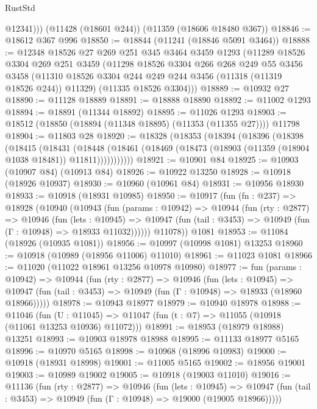 \begin{lexlean}{RustStd}
\begin{coremodule}
{{{{{{{{{{{{{{{{{{{          @12341)))
    (@11428 (@18601 @244))
    (@11359 (@18606 @18480 @367))
@18846 := @18612 @367 @996
@18850 := @18844 (@11241 (@18846 @5091 @3464))
@18888 := @12348
    @18526
    @27
    @269
    @251
    @345
    @3464
    @3459
    @1293
    (@11289
      @18526
      @3304
      @269
      @251
      @3459
      (@11298
        @18526
        @3304
        @266
        @268
        @249
        @55
        @3456
        @3458
        (@11310 @18526 @3304 @244 @249 @244 @3456 (@11318 (@11319 @18526 @244)) @11329)
        (@11335 @18526 @3304)))
@18889 := @10932 @27
@18890 := @11128 @18889
@18891 := @18888 @18890
@18892 := @11002 @1293
@18894 := @18891 (@11344 @18892)
@18895 := @11026 @1293
@18903 := @18512 (@18850 (@18894 (@11348 @18895) (@11353 (@11355 @27)))) @11798
@18904 := @11803 @28
@18920 := @18328
    (@18353
      (@18394
        (@18396
          (@18398
            (@18415
              (@18431
                (@18448
                  (@18461 (@18469 (@18473 (@18903 (@11359 (@18904 @1038 @18481)) @11811)))))))))))
@18921 := @10901 @84
@18925 := @10903 (@10907 @84) (@10913 @84)
@18926 := @10922 @13250
@18928 := @10918 (@18926 @10937)
@18930 := @10960 (@10961 @84)
@18931 := @10956 @18930
@18933 := @10918 (@18931 @10985)
@18950 := @10917
    (fun (fn : @237) =>
    @18928
      (@10940
        (@10943
          (fun (params : @10942) =>
          @10944
            (fun (rty : @2877) =>
            @10946
              (fun (lets : @10945) =>
              @10947 (fun (tail : @3453) => @10949 (fun (Γ : @10948) => @18933 @11032))))))
        @11078))
    @1081
@18953 := @11084 (@18926 (@10935 @1081))
@18956 := @10997 (@10998 @1081) @13253
@18960 := @10918 (@10989 (@18956 @11006) @11010)
@18961 := @11023 @1081
@18966 := @11020 (@11022 @18961 @13256 @10978 @10980)
@18977 := fun (params : @10942) =>
  @10944
    (fun (rty : @2877) =>
    @10946
      (fun (lets : @10945) =>
      @10947 (fun (tail : @3453) => @10949 (fun (Γ : @10948) => @18933 (@18960 @18966)))))
@18978 := @10943 @18977
@18979 := @10940 @18978
@18988 := @11046
    (fun (U : @11045) => @11047 (fun (t : @7) => @11055 (@10918 (@11061 @13253 @10936) @11072)))
@18991 := @18953 (@18979 @18988) @13251
@18993 := @10903 @18978 @18988
@18995 := @11133 @18977 @5165
@18996 := @10970 @5165
@18998 := @10968 (@18996 @10983)
@19000 := @10918 (@18931 @18998)
@19001 := @11005 @5165
@19002 := @18956 @19001
@19003 := @10989 @19002
@19005 := @10918 (@19003 @11010)
@19016 := @11136
    (fun (rty : @2877) =>
    @10946
      (fun (lets : @10945) =>
      @10947 (fun (tail : @3453) => @10949 (fun (Γ : @10948) => @19000 (@19005 @18966)))))
}}}}}}}}}}}}}}}}}}}
\end{coremodule}
\end{lexlean}
